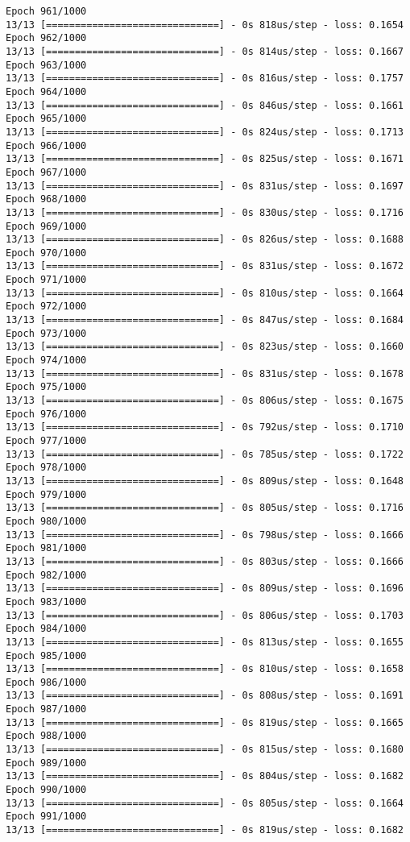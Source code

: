 \documentclass[11pt]{article}
\begin{document}
\begin{Verbatim}[commandchars=\\\{\}]
Epoch 961/1000
13/13 [==============================] - 0s 818us/step - loss: 0.1654
Epoch 962/1000
13/13 [==============================] - 0s 814us/step - loss: 0.1667
Epoch 963/1000
13/13 [==============================] - 0s 816us/step - loss: 0.1757
Epoch 964/1000
13/13 [==============================] - 0s 846us/step - loss: 0.1661
Epoch 965/1000
13/13 [==============================] - 0s 824us/step - loss: 0.1713
Epoch 966/1000
13/13 [==============================] - 0s 825us/step - loss: 0.1671
Epoch 967/1000
13/13 [==============================] - 0s 831us/step - loss: 0.1697
Epoch 968/1000
13/13 [==============================] - 0s 830us/step - loss: 0.1716
Epoch 969/1000
13/13 [==============================] - 0s 826us/step - loss: 0.1688
Epoch 970/1000
13/13 [==============================] - 0s 831us/step - loss: 0.1672
Epoch 971/1000
13/13 [==============================] - 0s 810us/step - loss: 0.1664
Epoch 972/1000
13/13 [==============================] - 0s 847us/step - loss: 0.1684
Epoch 973/1000
13/13 [==============================] - 0s 823us/step - loss: 0.1660
Epoch 974/1000
13/13 [==============================] - 0s 831us/step - loss: 0.1678
Epoch 975/1000
13/13 [==============================] - 0s 806us/step - loss: 0.1675
Epoch 976/1000
13/13 [==============================] - 0s 792us/step - loss: 0.1710
Epoch 977/1000
13/13 [==============================] - 0s 785us/step - loss: 0.1722
Epoch 978/1000
13/13 [==============================] - 0s 809us/step - loss: 0.1648
Epoch 979/1000
13/13 [==============================] - 0s 805us/step - loss: 0.1716
Epoch 980/1000
13/13 [==============================] - 0s 798us/step - loss: 0.1666
Epoch 981/1000
13/13 [==============================] - 0s 803us/step - loss: 0.1666
Epoch 982/1000
13/13 [==============================] - 0s 809us/step - loss: 0.1696
Epoch 983/1000
13/13 [==============================] - 0s 806us/step - loss: 0.1703
Epoch 984/1000
13/13 [==============================] - 0s 813us/step - loss: 0.1655
Epoch 985/1000
13/13 [==============================] - 0s 810us/step - loss: 0.1658
Epoch 986/1000
13/13 [==============================] - 0s 808us/step - loss: 0.1691
Epoch 987/1000
13/13 [==============================] - 0s 819us/step - loss: 0.1665
Epoch 988/1000
13/13 [==============================] - 0s 815us/step - loss: 0.1680
Epoch 989/1000
13/13 [==============================] - 0s 804us/step - loss: 0.1682
Epoch 990/1000
13/13 [==============================] - 0s 805us/step - loss: 0.1664
Epoch 991/1000
13/13 [==============================] - 0s 819us/step - loss: 0.1682

\end{Verbatim}
\end{document}
